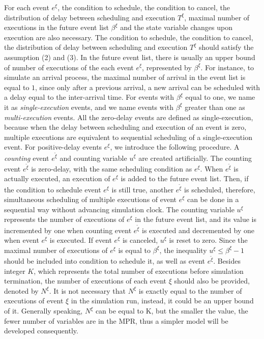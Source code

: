 \documentclass[]{interact}
\theoremstyle{plain}%
\theoremstyle{definition}
\theoremstyle{remark}
\begin{document}
For each event $e^{\xi}$, the condition to schedule, the condition to cancel, the distribution of delay between scheduling and execution $T^{\xi}$, maximal number of executions in the future event list $\beta^{\xi}$ and the state variable changes upon execution are also necessary. The condition to schedule, the condition to cancel, the distribution of delay between scheduling and execution $T^{\xi}$ should satisfy the assumption (2) and (3). In the future event list, there is usually an upper bound of number of executions of the each event $e^{\xi}$, represented by $\beta^{\xi}$. For instance, to simulate an arrival process, the maximal number of arrival in the event list is equal to $1$, since only after a previous arrival, a new arrival can be scheduled with a delay equal to the inter-arrival time. For events with $\beta^{\xi}$ equal to one, we name it as \textit{single-execution} events, and we name events with $\beta^{\xi}$ greater than one as \textit{multi-execution} events. All the zero-delay events are defined as single-execution, because when the delay between scheduling and execution of an event is zero, multiple executions are equivalent to sequential scheduling of a single-execution event. For positive-delay events $e^{\xi}$, we introduce the following procedure. A \textit{counting} event ${e}^{\tilde{\xi}}$ and counting variable $u^{\xi}$ are created artificially. The counting event ${e}^{\tilde{\xi}}$ is zero-delay, with the same scheduling condition as $e^{\xi}$. %
When ${e}^{\tilde{\xi}}$ is actually executed, an execution of $e^{\xi}$ is added to the future event list. Then, if the condition to schedule event $e^{\xi}$ is still true, another ${e}^{\tilde{\xi}}$ is scheduled, therefore, simultaneous scheduling of multiple executions of event $e^{\xi}$ can be done in a sequential way without advancing simulation clock. The counting variable $u^{\xi}$ represents the number of executions of $e^{\xi}$ in the future event list, and its value is incremented by one when counting event $e^{\tilde{\xi}}$ is executed and decremented by one when event $e^{\xi}$ is executed. If event $e^{\xi}$ is canceled, $u^{\xi}$ is reset to zero. Since the maximal number of executions of $e^{\xi}$ is equal to $\beta^{\xi}$, the inequality $u^{\xi}\le\beta^{\xi}-1$ should be included into condition to schedule it, as well as event $e^{\tilde{\xi}}$. Besides integer $K$, which represents the total number of executions before simulation termination, the number of executions of each event $\xi$ should also be provided, denoted by $N^{\xi}$. It is not necessary that $N^{\xi}$ is exactly equal to the number of executions of event $\xi$ in the simulation run, instead, it could be an upper bound of it. Generally speaking, $N^{\xi}$ can be equal to K, but the smaller the value, the fewer number of variables are in the MPR, thus a simpler model will be developed consequently.
\end{document}
